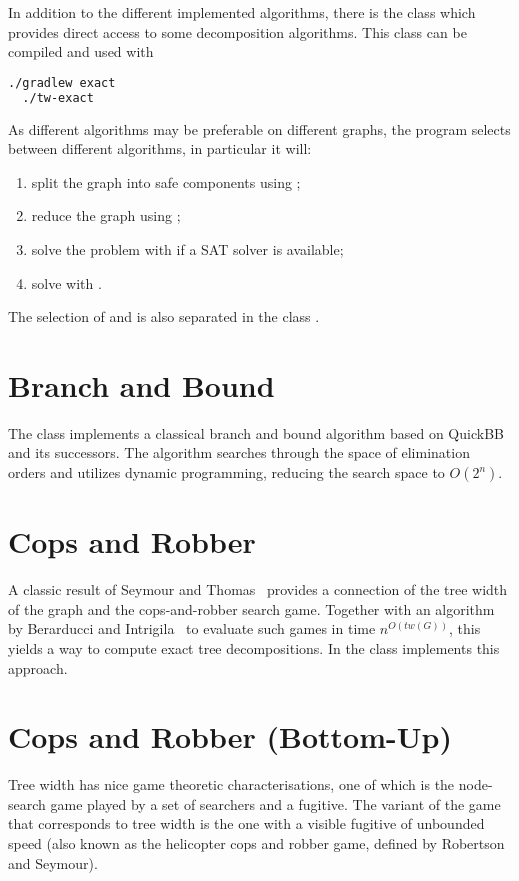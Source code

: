 \documentclass[a4paper, ukenglish, twoside, openright]{jdrasilmanual}
\begin{document}
In addition to the different implemented algorithms, there is the
class  which provides direct access to some
decomposition algorithms. This class can be compiled and used with
\begin{lstlisting}[language=bash]
  ./gradlew exact
  ./tw-exact
\end{lstlisting}
As different algorithms may be preferable on different graphs, the
program selects between different algorithms, in particular it will:
\begin{enumerate}
  \item split the graph into safe components using ;
  \item reduce the graph using ;
  \item solve the problem with  if a SAT solver
    is available;
  \item solve with .
\end{enumerate}
The selection of  and  is
also separated in the class .

\section{Branch and Bound}
The class  implements a classical branch and bound algorithm based on QuickBB~\cite{GogateD2004} and its successors.
The algorithm searches through the space of elimination orders and utilizes dynamic programming,
reducing the search space to $O(2^n)$.

\section{Cops and Robber}
A classic result of Seymour and Thomas~\cite{SeymourT1993}
provides a connection of the tree width of the graph and the
cops-and-robber search game. Together with an algorithm by Berarducci
and Intrigila~\cite{BerarducciI1993} to evaluate such games in time
$n^{O(tw(G))}$, this yields a way to compute exact tree decompositions. In
\Jdrasil{} the class  implements this approach.

\section{Cops and Robber (Bottom-Up)}
Tree width has nice game theoretic characterisations, one of which is
the node-search game played by a set of searchers and a fugitive. The
variant of the game that corresponds to tree width is the one with a
visible fugitive of unbounded speed (also known as the helicopter cops
and robber game, defined by Robertson and Seymour).
 
\end{document}
